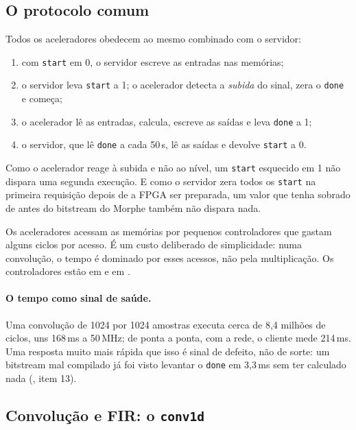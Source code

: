 \subsection{O protocolo comum}

Todos os aceleradores obedecem ao mesmo combinado com o servidor:

\begin{enumerate}
  \item com \texttt{start} em 0, o servidor escreve as entradas nas memórias;
  \item o servidor leva \texttt{start} a 1; o acelerador detecta a
    \emph{subida} do sinal, zera o \texttt{done} e começa;
  \item o acelerador lê as entradas, calcula, escreve as saídas e leva
    \texttt{done} a 1;
  \item o servidor, que lê \texttt{done} a cada 50\,\textmu s, lê as saídas e devolve
    \texttt{start} a 0.
\end{enumerate}

Como o acelerador reage à subida e não ao nível, um \texttt{start} esquecido em
1 não dispara uma segunda execução. E como o servidor zera todos os
\texttt{start} na primeira requisição depois de a FPGA ser preparada, um valor
que tenha sobrado de antes do bitstream do Morphe também não dispara nada.

Os aceleradores acessam as memórias por pequenos controladores que gastam
alguns ciclos por acesso. É um custo deliberado de simplicidade: numa
convolução, o tempo é dominado por esses acessos, não pela multiplicação. Os
controladores estão em  e em
.

\paragraph{O tempo como sinal de saúde.} Uma convolução de 1024 por 1024
amostras executa cerca de 8,4 milhões de ciclos, uns 168\,ms a 50\,MHz; de ponta
a ponta, com a rede, o cliente mede 214\,ms. Uma resposta muito mais rápida que
isso é sinal de defeito, não de sorte: um bitstream mal compilado já foi visto
levantar o \texttt{done} em 3,3\,ms sem ter calculado nada
(, item 13).

\subsection{Convolução e FIR: o \texttt{conv1d}}
\label{sec:acel-conv}

